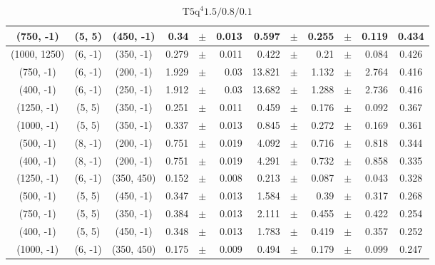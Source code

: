 \documentclass[12pt]{paper}
\newcommand{\TFiveqqqqHL}{\ensuremath{\textrm{T5q}^{4} 1.5/0.8/0.1}\xspace}
\begin{document}
\begin{table}[ht]
\begin{center}
{\begin{tabular}{|c|c|c|rrr|rrrrr|c|}
(750, -1)&(5, 5)&(450, -1)&0.34&$\pm$&0.013&0.597&$\pm$&0.255&$\pm$&0.119&0.434\\\hline
(1000, 1250)&(6, -1)&(350, -1)&0.279&$\pm$&0.011&0.422&$\pm$&0.21&$\pm$&0.084&0.426\\\hline
(750, -1)&(6, -1)&(200, -1)&1.929&$\pm$&0.03&13.821&$\pm$&1.132&$\pm$&2.764&0.416\\\hline
(400, -1)&(6, -1)&(250, -1)&1.912&$\pm$&0.03&13.682&$\pm$&1.288&$\pm$&2.736&0.416\\\hline
(1250, -1)&(5, 5)&(350, -1)&0.251&$\pm$&0.011&0.459&$\pm$&0.176&$\pm$&0.092&0.367\\\hline
(1000, -1)&(5, 5)&(350, -1)&0.337&$\pm$&0.013&0.845&$\pm$&0.272&$\pm$&0.169&0.361\\\hline
(500, -1)&(8, -1)&(200, -1)&0.751&$\pm$&0.019&4.092&$\pm$&0.716&$\pm$&0.818&0.344\\\hline
(400, -1)&(8, -1)&(200, -1)&0.751&$\pm$&0.019&4.291&$\pm$&0.732&$\pm$&0.858&0.335\\\hline
(1250, -1)&(6, -1)&(350, 450)&0.152&$\pm$&0.008&0.213&$\pm$&0.087&$\pm$&0.043&0.328\\\hline
(500, -1)&(5, 5)&(450, -1)&0.347&$\pm$&0.013&1.584&$\pm$&0.39&$\pm$&0.317&0.268\\\hline
(750, -1)&(5, 5)&(350, -1)&0.384&$\pm$&0.013&2.111&$\pm$&0.455&$\pm$&0.422&0.254\\\hline
(400, -1)&(5, 5)&(450, -1)&0.348&$\pm$&0.013&1.783&$\pm$&0.419&$\pm$&0.357&0.252\\\hline
(1000, -1)&(6, -1)&(350, 450)&0.175&$\pm$&0.009&0.494&$\pm$&0.179&$\pm$&0.099&0.247\\\hline
\end{tabular}}\end{center}\caption{\TFiveqqqqHL}\end{table}
\end{document}
